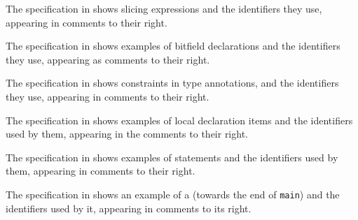 The specification in  shows slicing expressions
and the identifiers they use, appearing in comments to their right.



The specification in  shows examples
of bitfield declarations and the identifiers they use,
appearing as comments to their right.



The specification in 
shows constraints in type annotations, and the identifiers they use,
appearing in comments to their right.



The specification in  shows examples of local declaration items
and the identifiers used by them, appearing in the comments to their right.



The specification in  shows examples of statements
and the identifiers used by them, appearing in comments to their right.


The specification in  shows an example
of a \catcherterm{} (towards the end of \verb|main|)
and the identifiers used by it, appearing in comments to its right.

